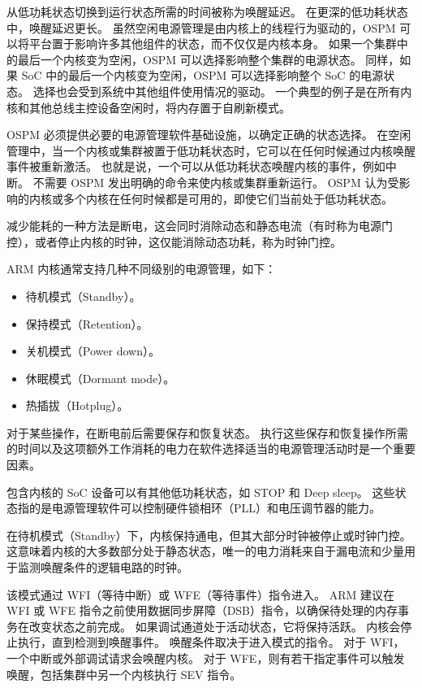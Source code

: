 从低功耗状态切换到运行状态所需的时间被称为唤醒延迟。
在更深的低功耗状态中，唤醒延迟更长。
虽然空闲电源管理是由内核上的线程行为驱动的，OSPM 可以将平台置于影响许多其他组件的状态，而不仅仅是内核本身。
如果一个集群中的最后一个内核变为空闲，OSPM 可以选择影响整个集群的电源状态。
同样，如果 SoC 中的最后一个内核变为空闲，OSPM 可以选择影响整个 SoC 的电源状态。
选择也会受到系统中其他组件使用情况的驱动。
一个典型的例子是在所有内核和其他总线主控设备空闲时，将内存置于自刷新模式。

OSPM 必须提供必要的电源管理软件基础设施，以确定正确的状态选择。
在空闲管理中，当一个内核或集群被置于低功耗状态时，它可以在任何时候通过内核唤醒事件被重新激活。
也就是说，一个可以从低功耗状态唤醒内核的事件，例如中断。
不需要 OSPM 发出明确的命令来使内核或集群重新运行。
OSPM 认为受影响的内核或多个内核在任何时候都是可用的，即使它们当前处于低功耗状态。


减少能耗的一种方法是断电，这会同时消除动态和静态电流（有时称为电源门控），或者停止内核的时钟，这仅能消除动态功耗，称为时钟门控。

ARM 内核通常支持几种不同级别的电源管理，如下：

\begin{itemize}
\item
  待机模式（Standby）。
\item
  保持模式（Retention）。
\item
  关机模式（Power down）。
\item
  休眠模式（Dormant mode）。
\item
  热插拔（Hotplug）。
\end{itemize}

对于某些操作，在断电前后需要保存和恢复状态。
执行这些保存和恢复操作所需的时间以及这项额外工作消耗的电力在软件选择适当的电源管理活动时是一个重要因素。

包含内核的 SoC 设备可以有其他低功耗状态，如 STOP 和 Deep sleep。
这些状态指的是电源管理软件可以控制硬件锁相环（PLL）和电压调节器的能力。


在待机模式（Standby）下，内核保持通电，但其大部分时钟被停止或时钟门控。
这意味着内核的大多数部分处于静态状态，唯一的电力消耗来自于漏电流和少量用于监测唤醒条件的逻辑电路的时钟。

该模式通过 WFI（等待中断）或 WFE（等待事件）指令进入。
ARM 建议在 WFI 或 WFE 指令之前使用数据同步屏障（DSB）指令，以确保待处理的内存事务在改变状态之前完成。
如果调试通道处于活动状态，它将保持活跃。
内核会停止执行，直到检测到唤醒事件。
唤醒条件取决于进入模式的指令。
对于 WFI，一个中断或外部调试请求会唤醒内核。
对于 WFE，则有若干指定事件可以触发唤醒，包括集群中另一个内核执行 SEV 指令。

